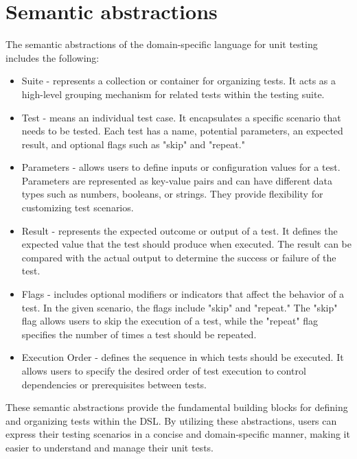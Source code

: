 \section{Semantic abstractions }
The semantic abstractions of the domain-specific language for unit testing includes the following:

\begin{itemize}

\item Suite - represents a collection or container for organizing tests. It acts as a high-level grouping mechanism for related tests within the testing suite.

\item Test - means an individual test case. It encapsulates a specific scenario that needs to be tested. Each test has a name, potential parameters, an expected result, and optional flags such as "skip" and "repeat."

\item Parameters - allows users to define inputs or configuration values for a test. Parameters are represented as key-value pairs and can have different data types such as numbers, booleans, or strings. They provide flexibility for customizing test scenarios.

\item Result - represents the expected outcome or output of a test. It defines the expected value that the test should produce when executed. The result can be compared with the actual output to determine the success or failure of the test.

\item Flags - includes optional modifiers or indicators that affect the behavior of a test. In the given scenario, the flags include "skip" and "repeat." The "skip" flag allows users to skip the execution of a test, while the "repeat" flag specifies the number of times a test should be repeated.

\item Execution Order - defines the sequence in which tests should be executed. It allows users to specify the desired order of test execution to control dependencies or prerequisites between tests.
\end{itemize}

These semantic abstractions provide the fundamental building blocks for defining and organizing tests within the DSL. By utilizing these abstractions, users can express their testing scenarios in a concise and domain-specific manner, making it easier to understand and manage their unit tests.
